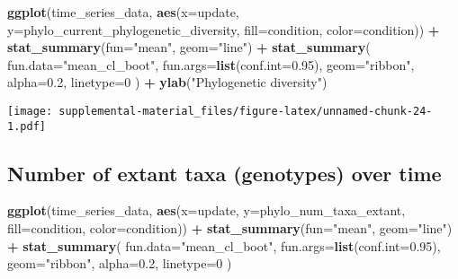 \documentclass[]{book}
\newenvironment{Shaded}{\begin{snugshade}}{\end{snugshade}}
\newcommand{\DataTypeTok}[1]{\textcolor[rgb]{0.13,0.29,0.53}{#1}}
\newcommand{\DecValTok}[1]{\textcolor[rgb]{0.00,0.00,0.81}{#1}}
\newcommand{\FloatTok}[1]{\textcolor[rgb]{0.00,0.00,0.81}{#1}}
\newcommand{\KeywordTok}[1]{\textcolor[rgb]{0.13,0.29,0.53}{\textbf{#1}}}
\newcommand{\NormalTok}[1]{#1}
\newcommand{\OperatorTok}[1]{\textcolor[rgb]{0.81,0.36,0.00}{\textbf{#1}}}
\newcommand{\StringTok}[1]{\textcolor[rgb]{0.31,0.60,0.02}{#1}}
\begin{document}
\begin{Shaded}
\begin{Highlighting}[]
\KeywordTok{ggplot}\NormalTok{(time_series_data, }\KeywordTok{aes}\NormalTok{(}\DataTypeTok{x=}\NormalTok{update, }\DataTypeTok{y=}\NormalTok{phylo_current_phylogenetic_diversity, }\DataTypeTok{fill=}\NormalTok{condition, }\DataTypeTok{color=}\NormalTok{condition)) }\OperatorTok{+}
\StringTok{  }\KeywordTok{stat_summary}\NormalTok{(}\DataTypeTok{fun=}\StringTok{"mean"}\NormalTok{, }\DataTypeTok{geom=}\StringTok{"line"}\NormalTok{) }\OperatorTok{+}
\StringTok{  }\KeywordTok{stat_summary}\NormalTok{(}
    \DataTypeTok{fun.data=}\StringTok{"mean_cl_boot"}\NormalTok{,}
    \DataTypeTok{fun.args=}\KeywordTok{list}\NormalTok{(}\DataTypeTok{conf.int=}\FloatTok{0.95}\NormalTok{),}
    \DataTypeTok{geom=}\StringTok{"ribbon"}\NormalTok{,}
    \DataTypeTok{alpha=}\FloatTok{0.2}\NormalTok{,}
    \DataTypeTok{linetype=}\DecValTok{0}
\NormalTok{  ) }\OperatorTok{+}
\StringTok{  }\KeywordTok{ylab}\NormalTok{(}\StringTok{"Phylogenetic diversity"}\NormalTok{)}
\end{Highlighting}
\end{Shaded}

\texttt{[image: supplemental-material\_files/figure-latex/unnamed-chunk-24-1.pdf]}

\hypertarget{number-of-extant-taxa-genotypes-over-time}{%
\subsection{Number of extant taxa (genotypes) over time}\label{number-of-extant-taxa-genotypes-over-time}}

\begin{Shaded}
\begin{Highlighting}[]
\KeywordTok{ggplot}\NormalTok{(time_series_data, }\KeywordTok{aes}\NormalTok{(}\DataTypeTok{x=}\NormalTok{update, }\DataTypeTok{y=}\NormalTok{phylo_num_taxa_extant, }\DataTypeTok{fill=}\NormalTok{condition, }\DataTypeTok{color=}\NormalTok{condition)) }\OperatorTok{+}
\StringTok{  }\KeywordTok{stat_summary}\NormalTok{(}\DataTypeTok{fun=}\StringTok{"mean"}\NormalTok{, }\DataTypeTok{geom=}\StringTok{"line"}\NormalTok{) }\OperatorTok{+}
\StringTok{  }\KeywordTok{stat_summary}\NormalTok{(}
    \DataTypeTok{fun.data=}\StringTok{"mean_cl_boot"}\NormalTok{,}
    \DataTypeTok{fun.args=}\KeywordTok{list}\NormalTok{(}\DataTypeTok{conf.int=}\FloatTok{0.95}\NormalTok{),}
    \DataTypeTok{geom=}\StringTok{"ribbon"}\NormalTok{,}
    \DataTypeTok{alpha=}\FloatTok{0.2}\NormalTok{,}
    \DataTypeTok{linetype=}\DecValTok{0}
\NormalTok{  )}
\end{Highlighting}
\end{Shaded}
\end{document}
